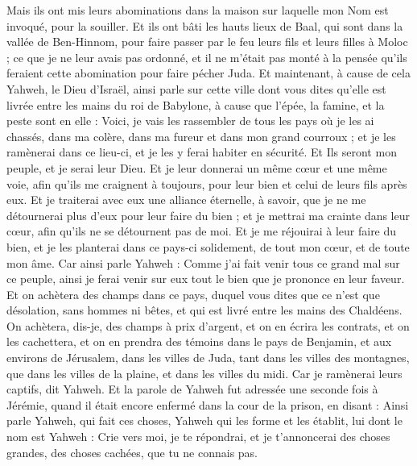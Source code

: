 \begin{multicols}{2}
Mais ils ont mis leurs abominations dans la maison sur laquelle mon Nom est invoqué, pour la souiller.
Et ils ont bâti les hauts lieux de Baal, qui sont dans la vallée de Ben-Hinnom, pour faire passer par le feu leurs fils et leurs filles à Moloc ; ce que je ne leur avais pas ordonné, et il ne m'était pas monté à la pensée qu'ils feraient cette abomination pour faire pécher Juda.
Et maintenant, à cause de cela Yahweh, le Dieu d'Israël, ainsi parle sur cette ville dont vous dites qu’elle est livrée entre les mains du roi de Babylone, à cause que l’épée, la famine, et la peste sont en elle :
Voici, je vais les rassembler de tous les pays où je les ai chassés, dans ma colère, dans ma fureur et dans mon grand courroux ; et je les ramènerai dans ce lieu-ci, et je les y ferai habiter en sécurité.
Et Ils seront mon peuple, et je serai leur Dieu.
Et je leur donnerai un même cœur et une même voie, afin qu'ils me craignent à toujours, pour leur bien et celui de leurs fils après eux.
Et je traiterai avec eux une alliance éternelle, à savoir, que je ne me détournerai plus d'eux pour leur faire du bien ; et je mettrai ma crainte dans leur cœur, afin qu'ils ne se détournent pas de moi.
Et je me réjouirai à leur faire du bien, et je les planterai dans ce pays-ci solidement, de tout mon cœur, et de toute mon âme.
Car ainsi parle Yahweh : Comme j'ai fait venir tous ce grand mal sur ce peuple, ainsi je ferai venir sur eux tout le bien que je prononce en leur faveur.
Et on achètera des champs dans ce pays, duquel vous dites que ce n'est que désolation, sans hommes ni bêtes, et qui est livré entre les mains des Chaldéens.
On achètera, dis-je, des champs à prix d'argent, et on en écrira les contrats, et on les cachettera, et on en prendra des témoins dans le pays de Benjamin, et aux environs de Jérusalem, dans les villes de Juda, tant dans les villes des montagnes, que dans les villes de la plaine, et dans les villes du midi. Car je ramènerai leurs captifs, dit Yahweh.
\VerseOne{}Et la parole de Yahweh fut adressée une seconde fois à Jérémie, quand il était encore enfermé dans la cour de la prison, en disant :
Ainsi parle Yahweh, qui fait ces choses, Yahweh qui les forme et les établit, lui dont le nom est Yahweh :
Crie vers moi, je te répondrai, et je t'annoncerai des choses grandes, des choses cachées, que tu ne connais pas.

\end{multicols}
